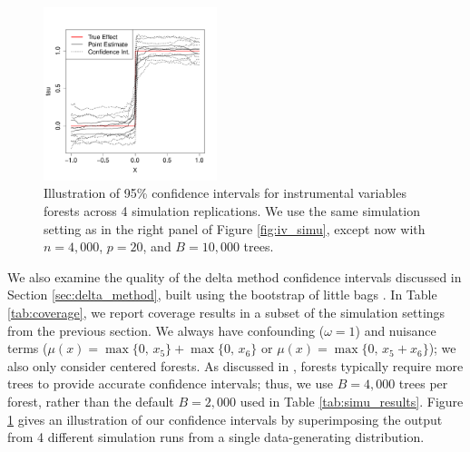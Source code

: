 \documentclass[aos]{imsart}
\theoremstyle{plain}
\theoremstyle{definition}
\theoremstyle{remark}
\newcommand{\FIGW}{0.45}
\begin{document}
\begin{CJK}{UTF8}{gbsn}
\begin{appendix}
\begin{figure}
\includegraphics[width=\FIGW\textwidth]{IV_plot_with_CI.pdf}
\caption{Illustration of 95\% confidence intervals for instrumental variables forests across 4 simulation replications.
We use the same simulation setting as in the right panel of Figure \ref{fig:iv_simu},
except now with $n = 4,000$, $p = 20$, and $B = 10,000$ trees.}
\label{fig:ci_picture}
\vspace{-1.5\baselineskip}
\end{figure}

We also examine the quality of the delta method confidence intervals discussed in
Section \ref{sec:delta_method}, built using the bootstrap of little bags \citep{sexton2009standard}.
In Table \ref{tab:coverage}, we report coverage results in a subset of the simulation settings from the previous
section. We always have confounding ($\omega = 1$) and nuisance terms
($\mu(x) = \max\{0, \, x_5\} + \max\{0, \, x_6\}$ or $\mu(x) = \max\{0, \, x_5 + x_6\}$);
we also only consider centered forests. As discussed in \citet{wager2014confidence}, forests
typically require more trees to provide accurate confidence intervals; thus, we use $B = 4,000$ trees
per forest, rather than the default $B = 2,000$ used in Table \ref{tab:simu_results}.
Figure \ref{fig:ci_picture} gives an illustration of our confidence intervals by superimposing
the output from 4 different simulation runs from a single data-generating distribution.


\end{appendix}
\end{CJK}
\end{document}
